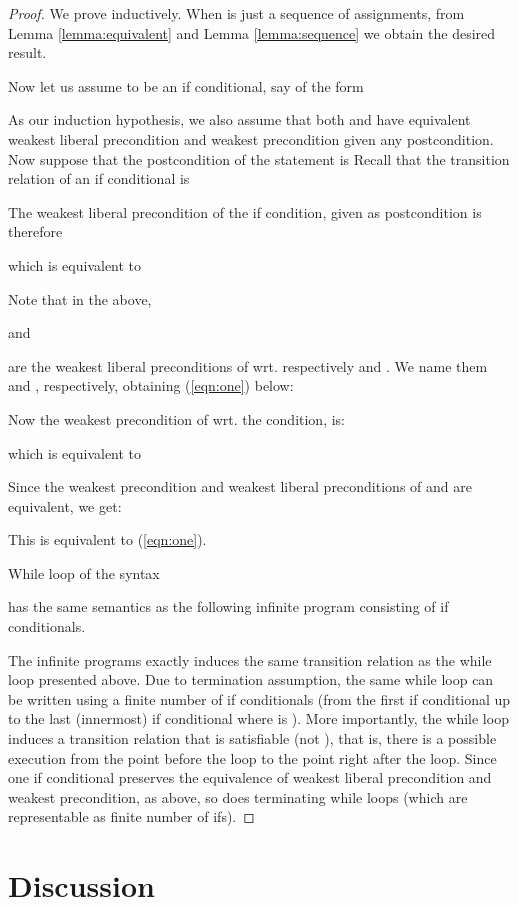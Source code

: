 \documentclass[times]{elsarticle}
\begin{document}
\begin{proof}
  We prove inductively. When  is just a sequence of assignments,
  from Lemma \ref{lemma:equivalent} and Lemma \ref{lemma:sequence} we
  obtain the desired result.

  Now let us assume  to be an if conditional, say of the form

As our induction hypothesis, we also assume that both  and  have
equivalent weakest liberal precondition and weakest precondition given
any postcondition. Now suppose that the postcondition of the statement
is  Recall that the transition relation of an if conditional is

The weakest liberal precondition of the if condition, given
 as postcondition is therefore

which is equivalent to

Note that in the above,

and

are the weakest liberal preconditions of 
wrt. respectively  and . We name them
 and ,
respectively, obtaining (\ref{eqn:one}) below:

Now the weakest precondition of  wrt. the  condition, is:

which is equivalent to

Since the weakest precondition and weakest liberal preconditions of
 and  are equivalent, we get:

This is equivalent to (\ref{eqn:one}).

While loop of the syntax

has the same semantics as the following infinite program consisting of
if conditionals.

The infinite programs exactly induces the same transition relation as
the while loop presented above. Due to termination assumption, the
same while loop can be written using a finite number of if
conditionals (from the first if conditional up to the last (innermost)
if conditional where  is ). More importantly, the while
loop induces a transition relation that is satisfiable (not
), that is, there is a possible execution from the point
before the loop to the point right after the loop. Since one if
conditional preserves the equivalence of weakest liberal precondition
and weakest precondition, as above, so does terminating while loops
(which are representable as finite number of ifs).
\end{proof}

\section{Discussion}
\label{sec:discussion}
\end{document}
